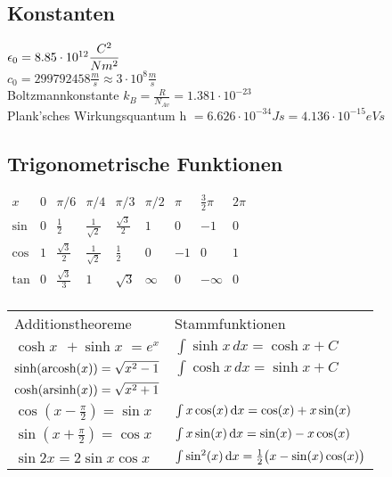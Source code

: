 \documentclass[fs, footer]{latex4ei}
\begin{document}
\begin{multicols*}{4}
\subsection{Konstanten}
$ \epsilon_0 = 8.85\cdot 10^{12} \dfrac{C^2}{Nm^2}$\\
$ c_0 = 299 792 458 \frac{m}{s} \approx 3\cdot 10^8 \frac{m}{s}$\\
Boltzmannkonstante $k_B = \frac{R}{N_{Av}} = 1.381\cdot 10^{-23}$\\
Plank'sches Wirkungsquantum h $= 6.626\cdot 10^{-34}Js = 4.136\cdot 10^{-15}eVs$




\subsection{Trigonometrische Funktionen}

$\begin{array}{c|c|c|c|c|c|c|c|c}
x & 0 & \pi / 6 & \pi / 4 & \pi / 3 & \pi / 2 & \pi & \frac{3}{2}\pi & 2 \pi \\ \hline
\sin & 0 & \frac{1}{2} & \frac{1}{\sqrt{2}} & \frac{\sqrt 3}{2} & 1 & 0 & -1 & 0 \\
\cos & 1 & \frac{\sqrt 3}{2} & \frac{1}{\sqrt 2} & \frac{1}{2} & 0 & -1 & 0 & 1 \\     
\tan & 0 & \frac{\sqrt{3}}{3}&	1				 &	\sqrt{3} & \infty & 0 & - \infty & 0\\
\end{array}$ 

\iffalse
\begin{tabular}{l  l} 
		Additionstheoreme &	Stammfunktionen \\
	$\cosh x \,\; + \sinh x \,\,= e^{x}$ & $\int \sinh x \, dx = \cosh x + C$\\
	$\sinh({\rm arcosh}(x)) = \sqrt{x^2 - 1}$ & $\int \cosh x \, dx = \sinh x + C $\\
	$\cosh({\rm arsinh}(x)) = \sqrt{x^2 + 1}$ \\
	
 	$\cos (x - \frac{\pi}{2}) = \sin x$ & $\int x \cos(x) \diff x = \cos(x) + x \sin(x)$\\
 	
 	 $\sin (x + \frac{\pi}{2}) = \cos x$ & $\int x \sin(x) \diff x = \sin(x) - x \cos(x)$\\
 	
 	$\sin 2x = 2 \sin x \cos x $  & $\int \sin^2(x) \diff x = \frac12 \bigl(x - \sin(x)\cos(x) \bigr)$\\
     

\end{tabular}
\end{multicols*}
\end{document}
